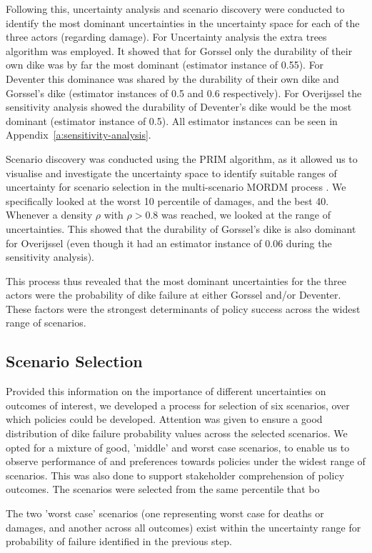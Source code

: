 Following this, uncertainty analysis and scenario discovery were conducted to identify the most dominant uncertainties in the uncertainty space for each of the three actors (regarding damage). For Uncertainty analysis the extra trees algorithm was employed. It showed that for Gorssel only the durability of their own dike was by far the most dominant (estimator instance of 0.55). For Deventer this dominance was shared by the durability of their own dike and Gorssel's dike (estimator instances of 0.5 and 0.6 respectively). For Overijssel the sensitivity analysis showed the durability of Deventer's dike would be the most dominant (estimator instance of 0.5). All estimator instances can be seen in Appendix~\ref{a:sensitivity-analysis}.

Scenario discovery was conducted using the PRIM algorithm, as it allowed us to visualise and investigate the uncertainty space to identify suitable ranges of uncertainty for scenario selection in the multi-scenario MORDM process \parencite{bryant_thinking_2010}. We specifically looked at the worst 10 percentile of damages, and the best 40. Whenever a density $\rho$ with $\rho>0.8$ was reached, we looked at the range of uncertainties. This showed that the durability of Gorssel's dike is also dominant for Overijssel (even though it had an estimator instance of 0.06 during the sensitivity analysis).

This process thus revealed that the most dominant uncertainties for the three actors were the probability of dike failure at either Gorssel and/or Deventer. These factors were the strongest determinants of policy success across the widest range of scenarios.

\subsection{Scenario Selection}
Provided this information on the importance of different uncertainties on outcomes of interest, we developed a process for selection of six scenarios, over which policies could be developed. Attention was given to ensure a good distribution of dike failure probability values across the selected scenarios. We opted for a mixture of good, 'middle' and worst case scenarios, to enable us to observe performance of and preferences towards policies under the widest range of scenarios. This was also done to support stakeholder comprehension of policy outcomes. The scenarios were selected from the same percentile that bo


The two 'worst case' scenarios (one representing worst case for deaths or damages, and another across all outcomes) exist within the uncertainty range for probability of failure identified in the previous step.


